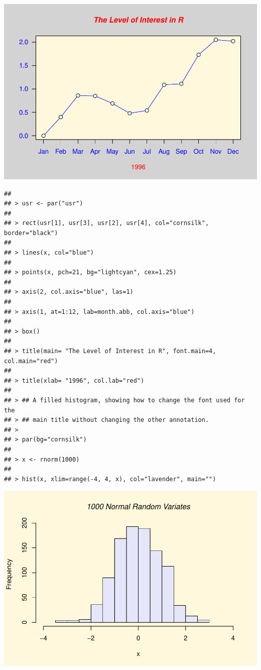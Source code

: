 \documentclass[
]{book}
\begin{document}
\includegraphics{bookdown-demo_files/figure-latex/unnamed-chunk-5-6.pdf}

\begin{verbatim}
## 
## > usr <- par("usr")
## 
## > rect(usr[1], usr[3], usr[2], usr[4], col="cornsilk", border="black")
## 
## > lines(x, col="blue")
## 
## > points(x, pch=21, bg="lightcyan", cex=1.25)
## 
## > axis(2, col.axis="blue", las=1)
## 
## > axis(1, at=1:12, lab=month.abb, col.axis="blue")
## 
## > box()
## 
## > title(main= "The Level of Interest in R", font.main=4, col.main="red")
## 
## > title(xlab= "1996", col.lab="red")
## 
## > ## A filled histogram, showing how to change the font used for the
## > ## main title without changing the other annotation.
## > 
## > par(bg="cornsilk")
## 
## > x <- rnorm(1000)
## 
## > hist(x, xlim=range(-4, 4, x), col="lavender", main="")
\end{verbatim}

\includegraphics{bookdown-demo_files/figure-latex/unnamed-chunk-5-7.pdf}
\end{document}
